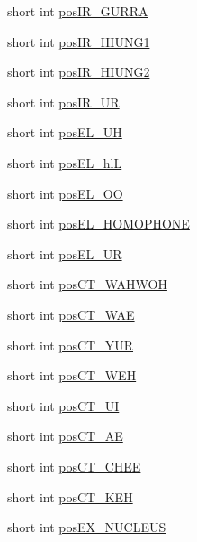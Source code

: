 \begin{CompactItemize}
short int \hyperlink{structkmaOrange_1_1SyllableInfo_4b90a34881329d4e7ad4cad0bb930101}{posIR\_\-GURRA}
\item 
short int \hyperlink{structkmaOrange_1_1SyllableInfo_2831622547e8f4e2523b9919a27fb9ec}{posIR\_\-HIUNG1}
\item 
short int \hyperlink{structkmaOrange_1_1SyllableInfo_38fae0187a8ba6130f21c89bf0ab6d48}{posIR\_\-HIUNG2}
\item 
short int \hyperlink{structkmaOrange_1_1SyllableInfo_a836d4f2a9b49b68a51140955fa2003c}{posIR\_\-UR}
\item 
short int \hyperlink{structkmaOrange_1_1SyllableInfo_0f4b431fc12d5cb188055862923bbfbe}{posEL\_\-UH}
\item 
short int \hyperlink{structkmaOrange_1_1SyllableInfo_0dd31a35a69439084e9cd4de0b78bcab}{posEL\_\-hlL}
\item 
short int \hyperlink{structkmaOrange_1_1SyllableInfo_6094f8b45ef8fb593bdf6ff07fee1814}{posEL\_\-OO}
\item 
short int \hyperlink{structkmaOrange_1_1SyllableInfo_7bd597a32af06f7b8dcf08ec37bdb7c6}{posEL\_\-HOMOPHONE}
\item 
short int \hyperlink{structkmaOrange_1_1SyllableInfo_7e5f47a330747e897d729b6d788a17cb}{posEL\_\-UR}
\item 
short int \hyperlink{structkmaOrange_1_1SyllableInfo_b55818f2b1df66a4ddb0439d94a3204e}{posCT\_\-WAHWOH}
\item 
short int \hyperlink{structkmaOrange_1_1SyllableInfo_508e4e61d5debce751b90fe6547b12c0}{posCT\_\-WAE}
\item 
short int \hyperlink{structkmaOrange_1_1SyllableInfo_b1ef6f78c941b0b2ff3bbee682d1b57f}{posCT\_\-YUR}
\item 
short int \hyperlink{structkmaOrange_1_1SyllableInfo_3e25ef463351473cb9c411ee5241f184}{posCT\_\-WEH}
\item 
short int \hyperlink{structkmaOrange_1_1SyllableInfo_adab0a715632279a137ee6ffbac0b48c}{posCT\_\-UI}
\item 
short int \hyperlink{structkmaOrange_1_1SyllableInfo_b1a07bfdd0b87150fcc77c0c3be19d20}{posCT\_\-AE}
\item 
short int \hyperlink{structkmaOrange_1_1SyllableInfo_90e6225b5393254a9195f4dd41890625}{posCT\_\-CHEE}
\item 
short int \hyperlink{structkmaOrange_1_1SyllableInfo_3a286e19dd3d592f3621540f79c6de17}{posCT\_\-KEH}
\item 
short int \hyperlink{structkmaOrange_1_1SyllableInfo_c4b430cdad3891bb8f7d6950d9f3a4f6}{posEX\_\-NUCLEUS}
\end{CompactItemize}


